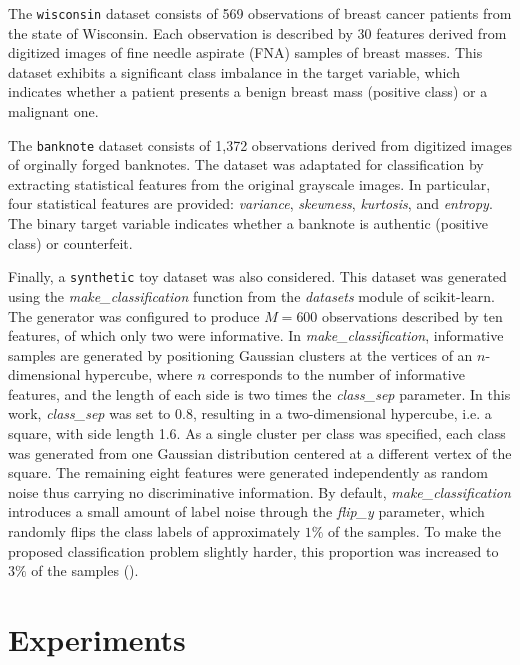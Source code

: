 \documentclass[12pt]{report} %
\begin{document}
The \texttt{wisconsin} dataset consists of 569 observations of breast cancer patients from the state of Wisconsin. Each observation is described by 30 features derived from digitized images of fine needle aspirate (FNA) samples of breast masses. This dataset exhibits a significant class imbalance in the target variable, which indicates whether a patient presents a benign breast mass (positive class) or a malignant one.

The \texttt{banknote} dataset consists of 1,372 observations derived from digitized images of orginally forged banknotes. The dataset was adaptated for classification by extracting statistical features from the original grayscale images. In particular, four statistical features are provided: \textit{variance}, \textit{skewness}, \textit{kurtosis}, and \textit{entropy}. The binary target variable indicates whether a banknote is authentic (positive class) or counterfeit.

Finally, a \texttt{synthetic} toy dataset was also considered. This dataset was generated using the \textit{make\_classification} function from the \textit{datasets} module of scikit-learn. The generator was configured to produce $M=600$ observations described by ten features, of which only two were informative. In \textit{make\_classification}, informative samples are generated by positioning Gaussian clusters at the vertices of an $n$-dimensional hypercube, where $n$ corresponds to the number of informative features, and the length of each side is two times the \textit{class\_sep} parameter. In this work, \textit{class\_sep} was set to 0.8, resulting in a two-dimensional hypercube, i.e. a square, with side length 1.6. As a single cluster per class was specified, each class was generated from one Gaussian distribution centered at a different vertex of the square. The remaining eight features were generated independently as random noise thus carrying no discriminative information. By default, \textit{make\_classification} introduces a small amount of label noise through the \textit{flip\_y} parameter, which randomly flips the class labels of approximately $1\%$ of the samples. To make the proposed classification problem slightly harder, this proportion was increased to $3\%$ of the samples (\cite{scikit-learn}).



\chapter{Experiments} \label{chap:experiment}
\end{document}
